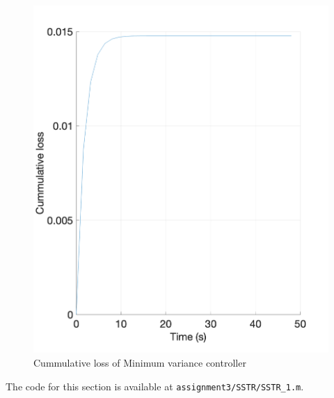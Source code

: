 \begin{figure}
	\centering
	\includegraphics[width=\textwidth]{images/sstr12.png}
	\caption{Cummulative loss of Minimum variance controller}
	\label{fig:sstr12}
\end{figure}

\noindent The code for this section is available at \lstinline|assignment3/SSTR/SSTR_1.m|. 
